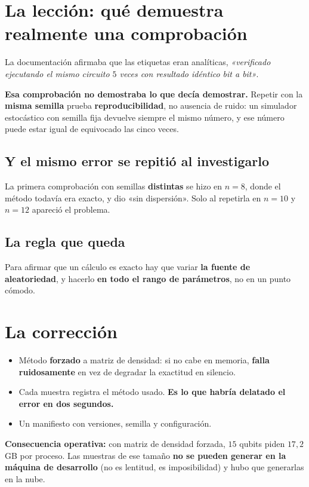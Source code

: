 \section{La lección: qué demuestra realmente una comprobación}
\label{sec:leccion}
La documentación afirmaba que las etiquetas eran analíticas, \textit{«verificado ejecutando el
mismo circuito $5$ veces con resultado idéntico bit a bit»}.

\textbf{Esa comprobación no demostraba lo que decía demostrar.} Repetir con la \textbf{misma
semilla} prueba \textbf{reproducibilidad}, no ausencia de ruido: un simulador estocástico con
semilla fija devuelve siempre el mismo número, y ese número puede estar igual de equivocado
las cinco veces.

\subsection{Y el mismo error se repitió al investigarlo}
La primera comprobación con semillas \textbf{distintas} se hizo en $n = 8$, donde el método
todavía era exacto, y dio «sin dispersión». Solo al repetirla en $n = 10$ y $n = 12$ apareció
el problema.

\subsection{La regla que queda}
Para afirmar que un cálculo es exacto hay que variar \textbf{la fuente de aleatoriedad}, y
hacerlo \textbf{en todo el rango de parámetros}, no en un punto cómodo.

\section{La corrección}
\label{sec:correccion}
\begin{itemize}
    \item Método \textbf{forzado} a matriz de densidad: si no cabe en memoria,
          \textbf{falla ruidosamente} en vez de degradar la exactitud en silencio.
    \item Cada muestra registra el método usado. \textbf{Es lo que habría delatado el error en
          dos segundos.}
    \item Un manifiesto con versiones, semilla y configuración.
\end{itemize}

\textbf{Consecuencia operativa:} con matriz de densidad forzada, $15$ qubits piden $17{,}2$\,GB por
proceso. Las muestras de ese tamaño \textbf{no se pueden generar en la máquina de desarrollo}
(no es lentitud, es imposibilidad) y hubo que generarlas en la nube.

